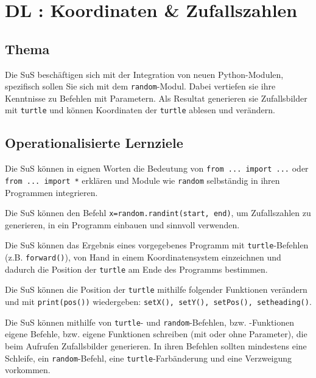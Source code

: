 \section{DL \themycounter: Koordinaten \& Zufallszahlen}
\begin{myExBox}[title=DL \themycounter]
\subsection*{Thema}
Die SuS beschäftigen sich mit der Integration von neuen Python-Modulen, spezifisch sollen Sie sich mit dem \lstinline|random|-Modul. Dabei vertiefen sie ihre Kenntnisse zu Befehlen mit Parametern. Als Resultat generieren sie Zufallsbilder mit \lstinline|turtle| und können Koordinaten der \lstinline|turtle| ablesen und verändern.


\subsection*{Operationalisierte Lernziele}
\begin{todolist}
    \item Die SuS können in eignen Worten die Bedeutung von \lstinline|from ... import ...| oder \lstinline|from ... import *| erklären und Module wie \lstinline|random| selbständig in ihren Programmen integrieren.
    \item Die SuS können den Befehl \lstinline|x=random.randint(start, end)|, um Zufallszahlen zu generieren, in ein Programm einbauen und sinnvoll verwenden.
    \item Die SuS können das Ergebnis eines vorgegebenes Programm mit \lstinline|turtle|-Befehlen (z.B. \lstinline|forward()|), von Hand in einem Koordinatensystem einzeichnen und dadurch die Position der \lstinline|turtle| am Ende des Programms bestimmen.
    \item Die SuS können die Position der \lstinline|turtle| mithilfe folgender Funktionen verändern und mit \lstinline|print(pos())| wiedergeben: \lstinline|setX(), setY(), setPos(), setheading()|. 
    \item Die SuS können mithilfe von \lstinline|turtle|- und \lstinline|random|-Befehlen, bzw. -Funktionen eigene Befehle, bzw. eigene Funktionen schreiben (mit oder ohne Parameter), die beim Aufrufen Zufallsbilder generieren. In ihren Befehlen sollten mindestens eine Schleife, ein \lstinline|random|-Befehl, eine \lstinline|turtle|-Farbänderung und eine Verzweigung vorkommen.
\end{todolist}


\end{myExBox}
